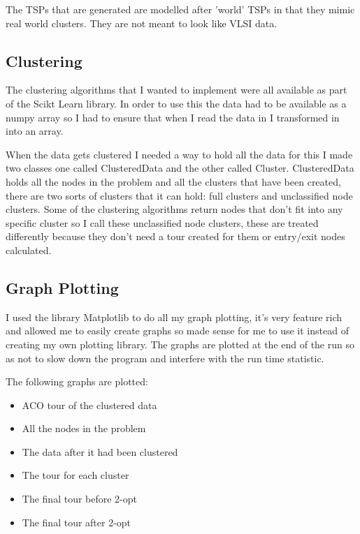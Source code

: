 The TSPs that are generated are modelled after 'world' TSPs in that they mimic real world clusters. They are not meant to look like VLSI data.

\subsection{Clustering}

The clustering algorithms that I wanted to implement were all available as part of the Scikt Learn library. In order to use this the data had to be available as a numpy array so I had to ensure that when I read the data in I transformed in into an array. 

When the data gets clustered I needed a way to hold all the data for this I made two classes one called ClusteredData and the other called Cluster. ClusteredData holds all the nodes in the problem and all the clusters that have been created, there are two sorts of clusters that it can hold: full clusters and unclassified node clusters. Some of the clustering algorithms return nodes that don't fit into any specific cluster so I call these unclassified node clusters, these are treated differently because they don't need a tour created for them or entry/exit nodes calculated. 

\subsection{Graph Plotting}

I used the library Matplotlib\cite{matplotlib} to do all my graph plotting, it's very feature rich and allowed me to easily create graphs so made sense for me to use it instead of creating my own plotting library. The graphs are plotted at the end of the run so as not to slow down the program and interfere with the run time statistic.

The following graphs are plotted:

\begin{itemize}
    \item ACO tour of the clustered data
    \item All the nodes in the problem
    \item The data after it had been clustered
    \item The tour for each cluster
    \item The final tour before 2-opt
    \item The final tour after 2-opt
\end{itemize}

